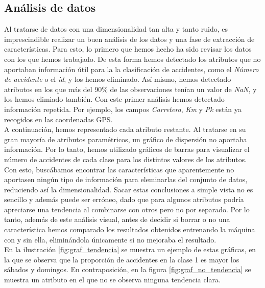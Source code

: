 \documentclass[journal,twoside]{JoPhA}
\begin{document}
\subsection{Análisis de datos}
Al tratarse de datos con una dimensionalidad tan alta y tanto ruido, es imprescindible realizar un buen análisis de los datos y una fase de extracción de características. Para esto, lo primero que hemos hecho ha sido revisar los datos con los que hemos trabajado. De esta forma hemos detectado los atributos que no aportaban información útil para la la clasificación de accidentes, como el \textit{Número de accidente} o el \textit{id}, y los hemos eliminado. Así mismo, hemos detectado atributos en los que más del 90\% de las observaciones tenían un valor de \textit{NaN}, y los hemos elimiado también. Con este primer análisis hemos detectado información repetida. Por ejemplo, los campos \textit{Carretera}, \textit{Km} y \textit{Pk} están ya recogidos en las coordenadas GPS. \\

A continuación, hemos representado cada atributo restante. Al tratarse en su gran mayoría de atributos paramétricos, un gráfico de dispersión no aportaba información. Por lo tanto, hemos utilizado gráficos de barras para visualizar el número de accidentes de cada clase para los distintos valores de los atributos. Con esto, buscábamos encontrar las características que aparentemente no aportasen ningún tipo de información para eleminarlas del conjunto de datos, reduciendo así la dimensionalidad. Sacar estas conclusiones a simple vista no es sencillo y además puede ser erróneo, dado que para algunos atributos podría apreciarse una tendencia al combinarse con otros pero no por separado. Por lo tanto, además de este análisis visual, antes de decidir si borrar o no una característica hemos comparado los resultados obtenidos entrenando la máquina con y sin ella, eliminándola únicamente si no mejoraba el resultado. \\

En la ilustración \ref{fig:graf_tendencia} se muestra un ejemplo de estas gráficas, en la que se observa que la proporción de accidentes en la clase 1 es mayor los sábados y domingos. En contraposición, en la figura \ref{fig:graf_no_tendencia} se muestra un atributo en el que no se observa ninguna tendencia clara.
\end{document}
